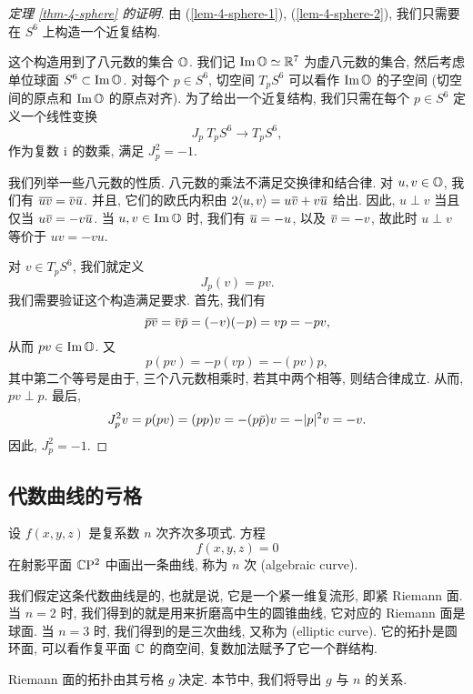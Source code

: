 \begin{proof} [定理 \ref{thm-4-sphere} 的证明]
    \newcommand*{\ImO}{\operatorname{Im}\bbO}
    \newcommand*{\vbarshort}{\oline1{v \mkern-1mu} \mkern1mu}
    由 (\ref{lem-4-sphere-1}), (\ref{lem-4-sphere-2}),
    我们只需要在 $S^6$ 上构造一个近复结构.

    这个构造用到了八元数的集合 $\bbO$.
    我们记 $\ImO \simeq \bbR^7$ 为虚八元数的集合,
    然后考虑单位球面 $S^6 \subset \ImO$.
    对每个 $p \in S^6$, 切空间 $T_p S^6$ 可以看作 $\ImO$ 的子空间 (切空间的原点和 $\ImO$ 的原点对齐).
    为了给出一个近复结构, 我们只需在每个 $p \in S^6$ 定义一个线性变换
    \[ J_p \: T_p S^6 \to T_p S^6, \]
    作为复数 $\upi$ 的数乘, 满足 $J_p^2 = -1$.

    我们列举一些八元数的性质.
    八元数的乘法不满足交换律和结合律. 对 $u,v \in \bbO$,
    我们有 $\oline1{uv} = \vbarshort \oline2u$.
    并且, 它们的欧氏内积由 $2 \langle u, v \rangle = u \oline1v + v \oline1u$ 给出.
    因此, $u \perp v$ 当且仅当 $u \oline1v = -v \oline1u$.
    当 $u, v \in \ImO$ 时, 我们有 $\oline1u = -u$, 以及 $\oline1v = -v$,
    故此时 $u \perp v$ 等价于 $uv = -vu$.

    对 $v \in T_p S^6$, 我们就定义
    \[ J_p (v) = pv. \]
    我们需要验证这个构造满足要求. 首先, 我们有
    \[ \oline2{pv} = \vbarshort \oline3p = (-v) (-p) = v p = -p v, \]
    从而 $pv \in \ImO$. 又
    \[ p(pv) = -p(vp) = -(pv)p, \]
    其中第二个等号是由于, 三个八元数相乘时, 若其中两个相等, 则结合律成立.
    从而, $pv \perp p$. 最后,
    \[ J_p^2 v = p(pv) = (pp)v = -(p\oline3p) v = -|p|^2 v = -v. \]
    因此, $J_p^2 = -1$.
\end{proof}


\subsection{代数曲线的亏格}

设 $f (x, y, z)$ 是复系数 $n$ 次齐次多项式. 方程
\[ f (x, y, z) = 0 \]
在射影平面 $\bbC \upP^2$ 中画出一条曲线, 称为 $n$ 次 (algebraic curve).

我们假定这条代数曲线是的, 也就是说,
它是一个紧一维复流形, 即紧 Riemann 面.
当 $n = 2$ 时, 我们得到的就是用来折磨高中生的圆锥曲线,
它对应的 Riemann 面是球面.
当 $n = 3$ 时, 我们得到的是三次曲线, 又称为 (elliptic curve).
它的拓扑是圆环面, 可以看作复平面 $\bbC$ 的商空间, 复数加法赋予了它一个群结构.

Riemann 面的拓扑由其亏格 $g$ 决定. 本节中, 我们将导出 $g$ 与 $n$ 的关系.


